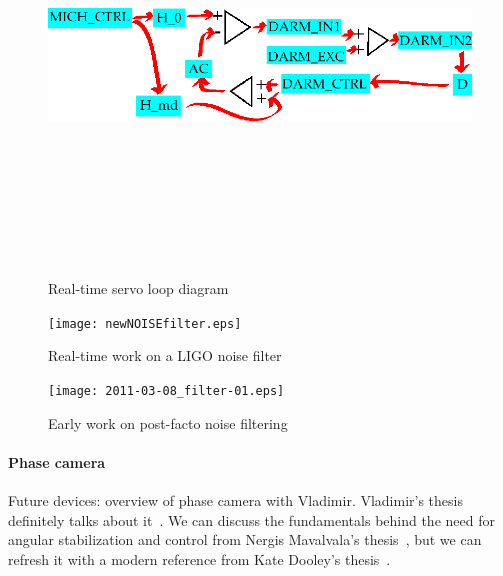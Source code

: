 	\begin{figure}
	\begin{center}
	\includegraphics[height=111mm, width=148mm]{servo_loop.eps}
	\caption{Real-time servo loop diagram}
	\label{servo_loop_realtime}
	\end{center}
	\end{figure}

	\begin{figure}
	\begin{center}
	\texttt{[image: newNOISEfilter.eps]}
	\caption{Real-time work on a LIGO noise filter}
	\label{newNOISEfilter}
	\end{center}
	\end{figure}

	\begin{figure}
	\begin{center}
	\texttt{[image: 2011-03-08\_filter-01.eps]}
	\caption{Early work on post-facto noise filtering}
	\label{filter_early}
	\end{center}
	\end{figure}

                \paragraph{Phase camera}
                \label{phase_camera}

                    Future devices: overview of phase camera with Vladimir. Vladimir's thesis definitely talks about it~\cite{DergachevThesis}. We can discuss the fundamentals behind the need for angular stabilization and control from Nergis Mavalvala's thesis~\cite{MavalvalaThesis}, but we can refresh it with a modern reference from Kate Dooley's thesis~\cite{DooleyThesis}.


